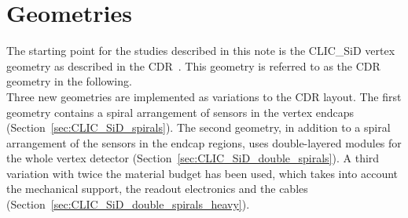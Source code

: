 \section{Geometries}\label{sec:Geometries}

The starting point for the studies described in this note is the CLIC\_SiD vertex geometry as described in the CDR~\cite{CLICCDR2012}. This geometry is referred to as the CDR geometry in the following. \\
Three new geometries are implemented as variations to the CDR layout. The first geometry contains a spiral arrangement of sensors in the vertex endcaps (Section~\ref{sec:CLIC_SiD_spirals}). The second geometry, in addition to a spiral arrangement of the sensors in the endcap regions, uses double-layered modules for the whole vertex detector (Section~\ref{sec:CLIC_SiD_double_spirals}). A third variation with twice the material budget has been used, which takes into account the mechanical support, the readout electronics and the cables (Section~\ref{sec:CLIC_SiD_double_spirals_heavy}).

